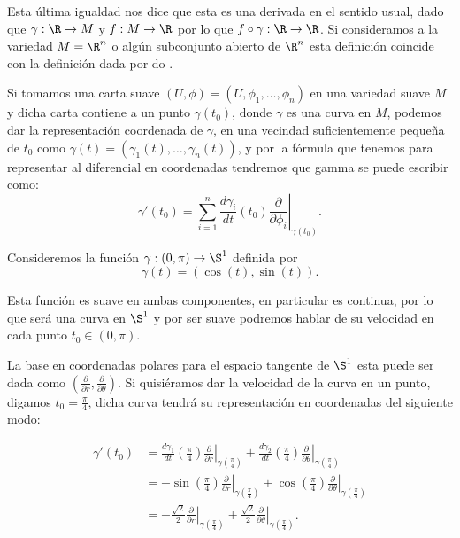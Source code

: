Esta última igualdad nos dice que esta es una derivada en el sentido usual, dado que $\gamma: \R \to M$ y $f: M \to \R$ por lo que $f \circ \gamma: \R \to \R$. Si consideramos a la variedad $M=\R^n$ o algún subconjunto abierto de $\R^n$ esta definición coincide con la definición dada por do \textcite{do2016differential}.

Si tomamos una carta suave $(U,\phi) = (U,\phi_1,\dots,\phi_n)$ en una variedad suave $M$ y dicha carta contiene a un punto $\gamma(t_0)$, donde $\gamma$ es una curva en $M$, podemos dar la representación coordenada de $\gamma$, en una vecindad suficientemente pequeña de $t_0$ como $\gamma(t) = (\gamma_1(t), \dots, \gamma_n(t))$, y por la fórmula que tenemos para representar al diferencial en coordenadas tendremos que gamma se puede escribir como:
\[
	\gamma'(t_0)=\sum_{i=1}^{n}\frac{d \gamma_i}{dt} (t_0)
	\left. \frac{\partial}{\partial \phi_i} \right|_{\gamma(t_0)}.
\]

\begin{example}
	Consideremos la función $\gamma: (0,\pi) \to \S^{1}$ definida por
	\[
		\gamma(t) = (\cos (t), \sin (t)).
	\]

	Esta función es suave en ambas componentes, en particular es continua, por lo que será una curva en $\S^1$ y por ser suave podremos hablar de su velocidad en cada punto $t_0 \in (0,\pi)$.

	La base en coordenadas polares para el espacio tangente de $\S^{1}$ esta puede ser dada como $\left( \frac{\partial}{\partial r} , \frac{\partial}{\partial \theta} \right)$. Si quisiéramos dar la velocidad de la curva en un punto, digamos $t_0 = \frac{\pi}{4}$, dicha curva tendrá su representación en coordenadas del siguiente modo:

	\begin{align*}
		\gamma'(t_0) & = \frac{d \gamma_1}{dt}\left( \frac{\pi}{4} \right)
		\left.\frac{\partial}{\partial r} \right|_{\gamma(\frac{\pi}{4})} +
		\frac{d \gamma_2}{dt} \left(\frac{\pi}{4} \right)
		\left.\frac{\partial}{\partial\theta} \right|_{\gamma(\frac{\pi}{4})} \\
		             & = -\sin \left(\frac{\pi}{4}\right)
		\left. \frac{\partial}{\partial r} \right|_{\gamma(\frac{\pi}{4})} +
		\cos \left( \frac{\pi}{4} \right)
		\left.\frac{\partial}{\partial\theta}\right|_{\gamma(\frac{\pi}{4})}  \\
		             & = -\frac{\sqrt{2}}{2}
		\left. \frac{\partial}{\partial r} \right|_{\gamma(\frac{\pi}{4})}
		+ \frac{\sqrt{2}}{2}
		\left. \frac{\partial}{\partial\theta} \right|_{\gamma(\frac{\pi}{4})}.
	\end{align*}
\end{example}

